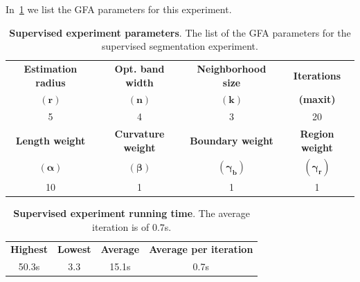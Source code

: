 \documentclass[review]{siamart220329}
\begin{document}
In~\cref{tab:coco-experiment-parameter} we list the GFA parameters for this experiment.
%
%
\begin{table}
\center
\footnotesize
	\caption{\textbf{Supervised experiment parameters}. The list of the GFA parameters for the supervised segmentation experiment.}\label{tab:coco-experiment-parameter}
\begin{tabular}{cccc}
\textbf{Estimation radius} & \textbf{Opt. band width} & \textbf{Neighborhood size} & \textbf{Iterations} \\
$\mathbf{(r)}$ & $\mathbf{(n)}$ & $\mathbf{(k)}$ & \textbf{(maxit)}\\
5 & 4 & 3 & 20\\[1em]
\textbf{Length weight} & \textbf{Curvature weight} & \textbf{Boundary weight} & \textbf{Region weight}\\
$\boldsymbol{(\alpha)}$ & $\boldsymbol{(\beta)}$ & $\boldsymbol{(\gamma_b)}$ & $\boldsymbol{(\gamma_r)}$\\
10 & 1 & 1 & 1
\end{tabular}
\end{table}
%
%
\begin{table}
\footnotesize
	\caption{\textbf{Supervised experiment running time}. The average iteration is of $0.7$s.}\label{tab:coco-experiment-running-time}
\center
\begin{tabular}{cccc}
\textbf{Highest} & \textbf{Lowest} & \textbf{Average} & \textbf{Average per iteration} \\
50.3s & 3.3 & 15.1s & 0.7s\\
\end{tabular}
\end{table}
%
%
\end{document}
